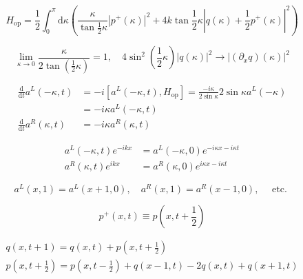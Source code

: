 \documentclass[main.tex]{subfiles}
\begin{document}
\begin{equation}\label{17.25}
	H_{\mathrm{op}}=\frac{1}{2} \int_{0}^{\pi} \mathrm{d} \kappa\left(\frac{\kappa}{\tan \frac{1}{2} \kappa}\left|p^{+}(\kappa)\right|^{2}+4 k \tan \frac{1}{2} \kappa\left|q(\kappa)+\frac{1}{2} p^{+}(\kappa)\right|^{2}\right)
\end{equation}



\begin{equation}\label{17.26}
	\lim _{\kappa \rightarrow 0} \frac{\kappa}{2 \tan \left(\frac{1}{2} \kappa\right)}=1, \quad 4 \sin ^{2}\left(\frac{1}{2} \kappa\right)|q(\kappa)|^{2} \rightarrow\left|\left(\partial_{x} q\right)(\kappa)\right|^{2}
\end{equation}



\begin{equation}\label{17.27}
	\begin{aligned} \frac{\mathrm{d}}{\mathrm{d} t} a^{L}(-\kappa, t) &=-i\left[a^{L}(-\kappa, t), H_{\mathrm{op}}\right]=\frac{-i \kappa}{2 \sin \kappa} 2 \sin \kappa a^{L}(-\kappa) \\ &=-i \kappa a^{L}(-\kappa, t) \\ \frac{\mathrm{d}}{\mathrm{d} t} a^{R}(\kappa, t) &=-i \kappa a^{R}(\kappa, t) \end{aligned}
\end{equation}



\begin{equation}\label{17.28}
	\begin{aligned} a^{L}(-\kappa, t) e^{-i k x} &=a^{L}(-\kappa, 0) e^{-i \kappa x-i \kappa t} \\ a^{R}(\kappa, t) e^{i k x} &=a^{R}(\kappa, 0) e^{i \kappa x-i \kappa t} \end{aligned}
\end{equation}



\begin{equation}\label{17.29}
	a^{L}(x, 1)=a^{L}(x+1,0), \quad a^{R}(x, 1)=a^{R}(x-1,0), \quad \text { etc. }
\end{equation}



\begin{equation}\label{17.30}
	p^{+}(x, t) \equiv p\left(x, t+\frac{1}{2}\right)
\end{equation}



\begin{equation}\label{17.31}
	\begin{array}{l}{q(x, t+1)=q(x, t)+p\left(x, t+\frac{1}{2}\right)} \\ {p\left(x, t+\frac{1}{2}\right)=p\left(x, t-\frac{1}{2}\right)+q(x-1, t)-2 q(x, t)+q(x+1, t)}\end{array}
\end{equation}
\end{document}
